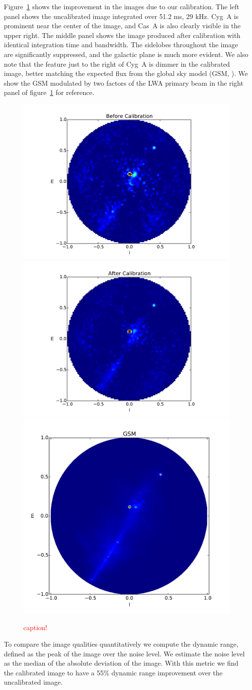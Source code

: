 \documentclass[a4paper,fleqn,usenatbib]{../mnras}
\begin{document}
Figure~\ref{fig:data_images} shows the improvement in the images due to our calibration. The left panel shows the uncalibrated image integrated over 51.2 ms, 29 kHz. Cyg~A is prominent near the center of the image, and Cas~A is also clearly visible in the upper right. The middle panel shows the image produced after calibration with identical integration time and bandwidth. The sidelobes throughout the image are significantly suppressed, and the galactic plane is much more evident. We also note that the feature just to the right of Cyg~A is dimmer in the calibrated image, better matching the expected flux from the global sky model (GSM, \citealt{deo08}). We show the GSM modulated by two factors of the LWA primary beam in the right panel of figure~\ref{fig:data_images} for reference.

\begin{figure}
\begin{center}
\includegraphics[width=0.33\linewidth]{figures/cal_paper_data_image_before.pdf}
\includegraphics[width=0.33\linewidth]{figures/cal_paper_data_image_after.pdf}
\includegraphics[width=0.33\linewidth]{figures/cal_paper_gsm_beam_weighted.pdf}
\caption{\textcolor{red}{caption!}}
\label{fig:data_images}
\end{center}
\end{figure}

To compare the image qualities quantitatively we compute the dynamic range, defined as the peak of the image over the noise level. We estimate the noise level as the median of the absolute deviation of the image. With this metric we find the calibrated image to have a 55\% dynamic range improvement over the uncalibrated image.
\end{document}
